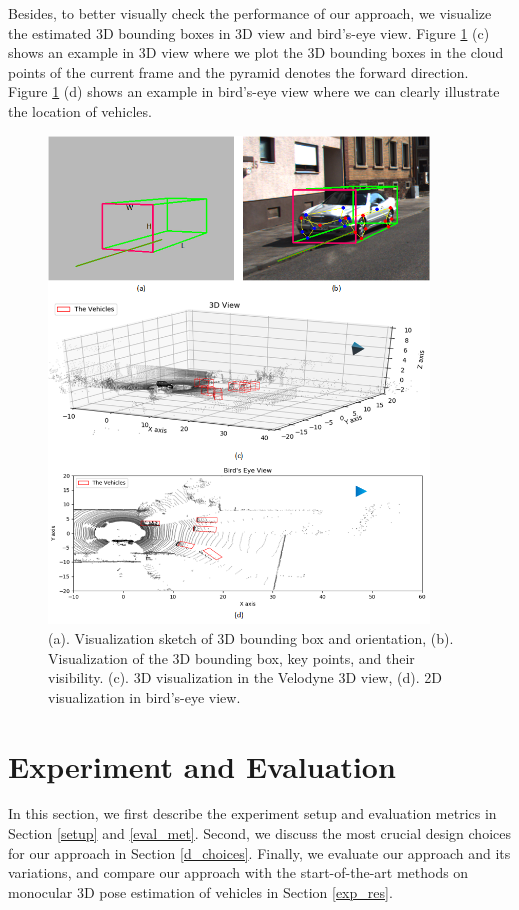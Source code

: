 \documentclass[a4paper,12pt]{article}
\begin{document}
Besides, to better visually check the performance of our approach, we visualize the estimated 3D bounding boxes in 3D view and bird's-eye view. Figure \ref{figure:visualization} (c) shows an example in 3D view where we plot the 3D bounding boxes in the cloud points of the current frame and the pyramid denotes the forward direction. Figure \ref{figure:visualization} (d) shows an example in bird's-eye view where we can clearly illustrate the location of vehicles.

\begin{figure}[H]		
	\includegraphics[width=0.9\textwidth]{visualization2.png}
	\caption[Visualization of the outputs of our approach]{(a). Visualization sketch of 3D bounding box and orientation, (b). Visualization of the 3D bounding box, key points, and their visibility. (c). 3D visualization in the Velodyne 3D view, (d). 2D visualization in bird's-eye view.}
	\centering
	\label{figure:visualization}
\end{figure}




\clearpage

\section{Experiment and Evaluation}
\label{exp_eva}
In this section, we first describe the experiment setup and evaluation metrics in Section \ref{setup} and \ref{eval_met}. Second, we discuss the most crucial design choices for our approach in Section \ref{d_choices}. Finally, we evaluate our approach and its variations, and compare our approach with the start-of-the-art methods on monocular 3D pose estimation of vehicles in Section \ref{exp_res}.
\end{document}
